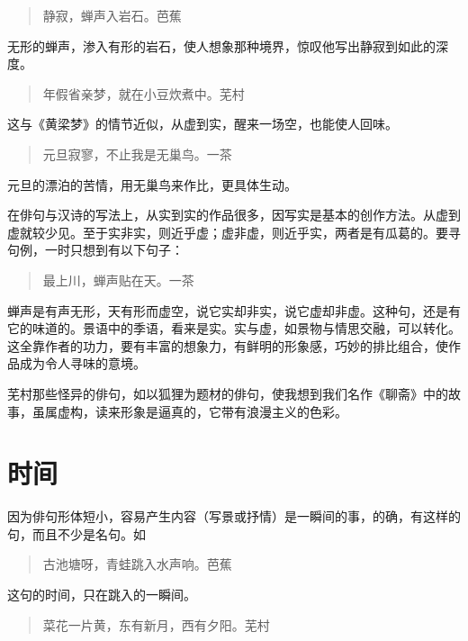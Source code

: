 {    \begin{quote}
        静寂，蝉声入岩石。\hfill 芭蕉
    \end{quote}

    无形的蝉声，渗入有形的岩石，使人想象那种境界，惊叹他写出静寂到如此的深度。

    \begin{quote}
        年假省亲梦，就在小豆炊煮中。\hfill 芜村
    \end{quote}

    这与《黄梁梦》的情节近似，从虚到实，醒来一场空，也能使人回味。

    \begin{quote}
        元旦寂寥，不止我是无巢鸟。\hfill 一茶
    \end{quote}

    元旦的漂泊的苦情，用无巢鸟来作比，更具体生动。

    在俳句与汉诗的写法上，从实到实的作品很多，因写实是基本的创作方法。从虚到虚就较少见。至于实非实，则近乎虚；虚非虚，则近乎实，两者是有瓜葛的。要寻句例，一时只想到有以下句子：

    \begin{quote}
        最上川，蝉声贴在天。\hfill 一茶
    \end{quote}

    蝉声是有声无形，天有形而虚空，说它实却非实，说它虚却非虚。这种句，还是有它的味道的。景语中的季语，看来是实。实与虚，如景物与情思交融，可以转化。这全靠作者的功力，要有丰富的想象力，有鲜明的形象感，巧妙的排比组合，使作品成为令人寻味的意境。

    芜村那些怪异的俳句，如以狐狸为题材的俳句，使我想到我们名作《聊斋》中的故事，虽属虚构，读来形象是逼真的，它带有浪漫主义的色彩。

    \section*{\FS 时间}

    因为俳句形体短小，容易产生内容（写景或抒情）是一瞬间的事，的确，有这样的句，而且不少是名句。如

    \begin{quote}
        古池塘呀，青蛙跳入水声响。\hfill 芭蕉
    \end{quote}

    这句的时间，只在跳入的一瞬间。

    \begin{quote}
        菜花一片黄，东有新月，西有夕阳。\hfill 芜村
    \end{quote}

}
